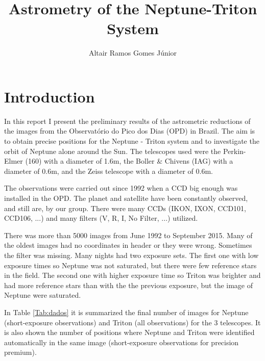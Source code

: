 \documentclass[12pt,a4paper]{report}
\author{Altair Ramos Gomes Júnior}
\title{Astrometry of the Neptune-Triton System}
\newcommand{\PE}{Perkin-Elmer }
\newcommand{\BC}{Boller \& Chivens }
\begin{document}
\maketitle

\pagestyle{headings}

\section*{Introduction}

In this report I present the preliminary results of the astrometric reductions of the images from the Observatório do Pico dos Dias (OPD) in Brazil. The aim is to obtain precise positions for the Neptune - Triton system and to investigate the orbit of Neptune alone around the Sun. The telescopes used were the \PE (160) with a diameter of 1.6m, the \BC (IAG) with a diameter of 0.6m, and the Zeiss telescope with a diameter of 0.6m.

The observations were carried out since 1992 when a CCD big enough was installed in the OPD. The planet and satellite have been constantly observed, and still are, by our group. There were many CCDs (IKON, IXON, CCD101, CCD106, ...) and many filters (V, R, I, No Filter, ...) utilized.

There was more than 5000 images from June 1992 to September 2015. Many of the oldest images had no coordinates in header or they were wrong. Sometimes the filter was missing. Many nights had two exposure sets. The first one with low exposure times so Neptune was not saturated, but there were few reference stars in the field. The second one with higher exposure time so Triton was brighter and had more reference stars than with the the previous exposure, but the image of Neptune were saturated.

In Table \ref{Tab:dados} it is summarized the final number of images for Neptune (short-exposure observations) and Triton (all observations) for the 3 telescopes. It is also shown the number of positions where Neptune and Triton were identified automatically in the same image (short-exposure observations for precision premium).
\end{document}
